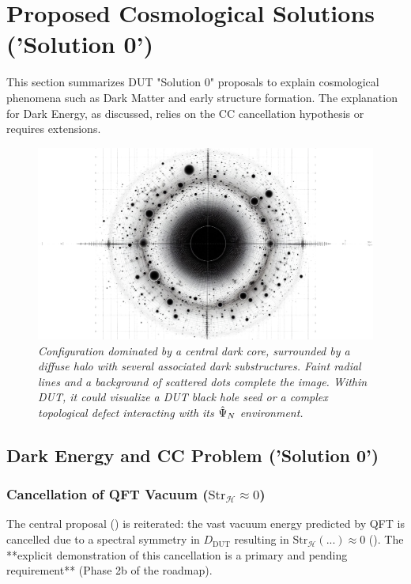 \documentclass[11pt, a4paper]{article}
\theoremstyle{remark}
\newcommand{\Op}[1]{\hat{#1}}
\newcommand{\Str}{\mathrm{Str}}
\begin{document}
\section{Proposed Cosmological Solutions ('Solution 0')}
\label{sec:cosmological_solutions_final_revised}

This section summarizes DUT "Solution 0" proposals to explain cosmological phenomena such as Dark Matter and early structure formation. The explanation for Dark Energy, as discussed, relies on the CC cancellation hypothesis or requires extensions.

\begin{figure}[htbp]
    \centering
    \includegraphics[width=0.6\linewidth]{OIG34.ZNLJ.PNG}
    \caption{%
       \footnotesize\textit{Configuration dominated by a central dark core, surrounded by a diffuse halo with several associated dark substructures. Faint radial lines and a background of scattered dots complete the image. Within DUT, it could visualize a DUT black hole seed or a complex topological defect interacting with its \(\protect\Op{\Psi}_N\) environment.}
    }
    \label{fig:Figura12}
\end{figure}

\subsection{Dark Energy and CC Problem ('Solution 0')}
\label{subsec:dark_energy_final_revised}

\subsubsection{Cancellation of QFT Vacuum (\texorpdfstring{$\Str_{\mathcal{H}} \approx 0$}{Str=0})}
\label{sec:cancelacion_vacio_final_revised}
The central proposal () is reiterated: the vast vacuum energy predicted by QFT is cancelled due to a spectral symmetry in \( D_{\text{DUT}} \) resulting in \( \Str_{\mathcal{H}}(...) \approx 0 \) (). The **explicit demonstration of this cancellation is a primary and pending requirement** (Phase 2b of the roadmap).
\end{document}
